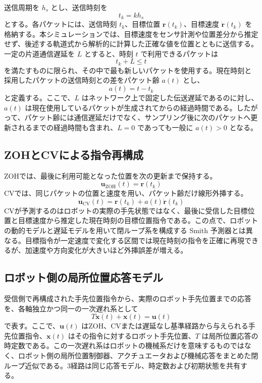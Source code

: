 \documentclass[11pt,a4paper]{article}
\newcommand{\vect}[1]{\bm{#1}}
\begin{document}
送信周期を $h_s$ とし、送信時刻を
\begin{equation}
 t_k = k h_s
\end{equation}
とする。各パケットには、送信時刻 $t_k$、目標位置 $\vect r(t_k)$、目標速度 $\dot{\vect r}(t_k)$ を格納する。本シミュレーションでは、目標速度をセンサ計測や位置差分から推定せず、後述する軌道式から解析的に計算した正確な値を位置とともに送信する。一定の片道通信遅延を $L$ とすると、時刻 $t$ で利用できるパケットは
\begin{equation}
 t_k + L \le t
\end{equation}
を満たすものに限られ、その中で最も新しいパケットを使用する。現在時刻と採用したパケットの送信時刻との差をパケット齢 $a(t)$ とし、
\begin{equation}
 a(t)=t-t_k
\end{equation}
と定義する。ここで、$L$ はネットワーク上で固定した伝送遅延であるのに対し、$a(t)$ は現在使用しているパケットが生成されてからの経過時間である。したがって、パケット齢には通信遅延だけでなく、サンプリング後に次のパケットへ更新されるまでの経過時間も含まれ、$L=0$ であっても一般に $a(t)>0$ となる。

\subsection{ZOHとCVによる指令再構成}

ZOHでは、最後に利用可能となった位置を次の更新まで保持する。
\begin{equation}
 \vect u_{\mathrm{ZOH}}(t)=\vect r(t_k)
\end{equation}
CVでは、同じパケットの位置と速度を用い、パケット齢だけ線形外挿する。
\begin{equation}
 \vect u_{\mathrm{CV}}(t)=\vect r(t_k)+a(t)\dot{\vect r}(t_k)
\end{equation}
CVが予測するのはロボットの実際の手先状態ではなく、最後に受信した目標位置と目標速度から推定した現在時刻の目標位置指令である。この点で、ロボットの動的モデルと遅延モデルを用いて閉ループ系を構成する Smith 予測器とは異なる。目標指令が一定速度で変化する区間では現在時刻の指令を正確に再現できるが、加速度や方向変化が大きいほど外挿誤差が増える。

\subsection{ロボット側の局所位置応答モデル}

受信側で再構成された手先位置指令から、実際のロボット手先位置までの応答を、各軸独立かつ同一の一次遅れ系として
\begin{equation}
 T\dot{\vect x}(t)+\vect x(t)=\vect u(t)
\end{equation}
で表す。ここで、$\vect u(t)$ はZOH、CVまたは遅延なし基準経路から与えられる手先位置指令、$\vect x(t)$ はその指令に対するロボット手先位置、$T$ は局所位置応答の時定数である。この一次遅れ系はロボットの機械系だけを意味するものではなく、ロボット側の局所位置制御器、アクチュエータおよび機械応答をまとめた閉ループ近似である。3経路は同じ応答モデル、時定数および初期状態を共有する。
\end{document}
